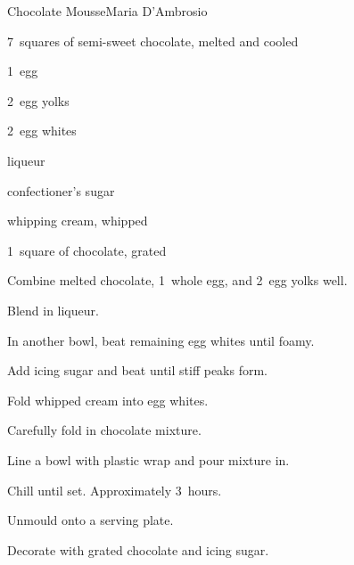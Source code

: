 \begin{recipe}{Chocolate Mousse}{Maria D'Ambrosio}{}

\begin{ingredients}
\item 7~squares of semi-sweet chocolate, melted and cooled
\item 1~egg
\item 2~egg yolks
\item 2~egg whites
\item {} liqueur
\item {} confectioner's sugar
\item {} whipping cream, whipped
\item 1~square of chocolate, grated
\end{ingredients}

\begin{directions}
\item Combine melted chocolate, 1~whole egg, and 2~egg yolks well.
\item Blend in liqueur.
\item In another bowl, beat remaining egg whites until foamy.
\item Add icing sugar and beat until stiff peaks form.
\item Fold whipped cream into egg whites.
\item Carefully fold in chocolate mixture.
\item Line a  bowl with plastic wrap and pour mixture in.
\item Chill until set. Approximately 3~hours.
\item Unmould onto a serving plate.
\item Decorate with grated chocolate and icing sugar.
\end{directions}

\end{recipe}
